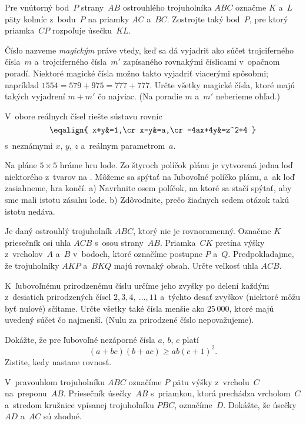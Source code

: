 {%
Pre vnútorný bod~$P$ strany~$AB$ ostrouhlého trojuholníka $ABC$ označme $K$ a~$L$ päty kolmíc z~bodu~$P$ na priamky $AC$ a~$BC$. Zostrojte taký bod~$P$, pre ktorý priamka~$CP$ rozpoľuje úsečku~$KL$.}

{%
Číslo nazveme {\it magickým\/} práve vtedy, keď sa dá vyjadriť ako súčet trojciferného čísla~$m$ a~trojciferného čísla~$m'$ zapísaného rovnakými číslicami v~opačnom poradí. Niektoré magické čísla možno takto vyjadriť viacerými spôsobmi; napríklad $1554=579+975=777+777$. Určte všetky magické čísla, ktoré majú takých vyjadrení $m+m'$
čo najviac. (Na poradie $m$ a~$m'$ neberieme ohľad.)}

{%
V~obore reálnych čísel riešte sústavu rovníc
$$\eqalign{
  x+y&=1,\cr
  x-y&=a,\cr
  -4ax+4y&=z^2+4
}$$
s~neznámymi $x$, $y$, $z$ a~reálnym parametrom~$a$.}

{%
Na pláne $5\times 5$ hráme hru lode. Zo štyroch políčok plánu je vytvorená jedna loď niektorého z~tvarov na \obr.
%
Môžeme sa spýtať na ľubovoľné políčko plánu, a~ak loď zasiahneme, hra končí.
\ite a) Navrhnite osem políčok, na ktoré sa stačí spýtať, aby sme mali
        istotu zásahu lode.
\ite b) Zdôvodnite, prečo žiadnych sedem otázok takú istotu nedáva.}

{%
Je daný ostrouhlý trojuholník $ABC$, ktorý nie je rovnoramenný. Označme $K$ priesečník osi uhla $ACB$ s~osou strany~$AB$. Priamka~$CK$ pretína výšky z~vrcholov~$A$ a~$B$ v~bodoch, ktoré označíme postupne $P$ a~$Q$. Predpokladajme, že trojuholníky $AKP$ a~$BKQ$ majú rovnaký obsah. Určte veľkosť uhla $ACB$.}

{%
K~ľubovoľnému prirodzenému číslu určíme jeho zvyšky po delení každým z~desiatich prirodzených čísel $2, 3, 4,~\dots, 11$ a~týchto desať zvyškov (niektoré môžu byť nulové) sčítame. Určte všetky také čísla menšie ako $25\,000$, ktoré majú uvedený súčet čo najmenší.
(Nulu za prirodzené číslo nepovažujeme).}

{%
Dokážte, že pre ľubovoľné nezáporné čísla $a$, $b$, $c$ platí
$$
(a+bc)(b+ac)\ge ab(c+1)^2.
$$
Zistite, kedy nastane rovnosť.}

{%
V~pravouhlom trojuholníku $ABC$ označíme $P$ pätu výšky z~vrcholu~$C$ na~preponu~$AB$. Priesečník úsečky~$AB$ s~priamkou, ktorá prechádza vrcholom~$C$ a~stredom kružnice vpísanej trojuholníku $PBC$, označíme~$D$. Dokážte, že úsečky $AD$ a~$AC$ sú zhodné.}

